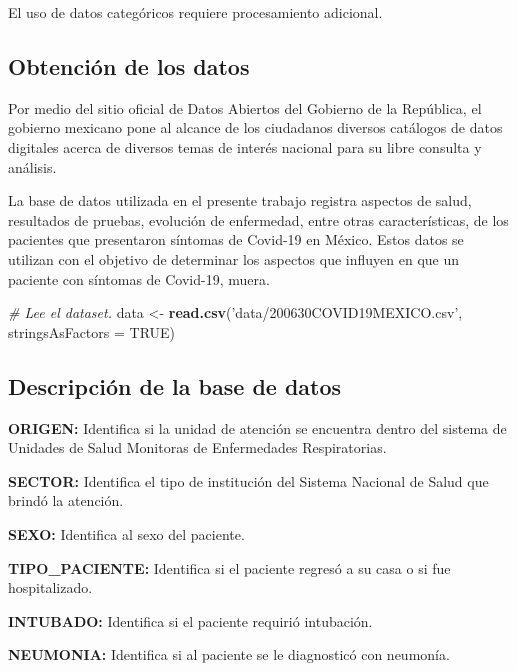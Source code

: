 \documentclass[]{article}
\newenvironment{Shaded}{\begin{snugshade}}{\end{snugshade}}
\newcommand{\CommentTok}[1]{\textcolor[rgb]{0.56,0.35,0.01}{\textit{#1}}}
\newcommand{\DataTypeTok}[1]{\textcolor[rgb]{0.13,0.29,0.53}{#1}}
\newcommand{\KeywordTok}[1]{\textcolor[rgb]{0.13,0.29,0.53}{\textbf{#1}}}
\newcommand{\NormalTok}[1]{#1}
\newcommand{\OtherTok}[1]{\textcolor[rgb]{0.56,0.35,0.01}{#1}}
\newcommand{\StringTok}[1]{\textcolor[rgb]{0.31,0.60,0.02}{#1}}
\begin{document}
El uso de datos categóricos requiere procesamiento adicional.

\hypertarget{obtenciuxf3n-de-los-datos}{%
\subsection{Obtención de los datos}\label{obtenciuxf3n-de-los-datos}}

Por medio del sitio oficial de Datos Abiertos del Gobierno de la
República, el gobierno mexicano pone al alcance de los ciudadanos
diversos catálogos de datos digitales acerca de diversos temas de
interés nacional para su libre consulta y análisis.

La base de datos utilizada en el presente trabajo registra aspectos de
salud, resultados de pruebas, evolución de enfermedad, entre otras
características, de los pacientes que presentaron síntomas de Covid-19
en México. Estos datos se utilizan con el objetivo de determinar los
aspectos que influyen en que un paciente con síntomas de Covid-19,
muera.

\begin{Shaded}
\begin{Highlighting}[]
\CommentTok{# Lee el dataset.}
\NormalTok{data <-}
\StringTok{  }\KeywordTok{read.csv}\NormalTok{(}\StringTok{'data/200630COVID19MEXICO.csv'}\NormalTok{, }\DataTypeTok{stringsAsFactors =} \OtherTok{TRUE}\NormalTok{)}
\end{Highlighting}
\end{Shaded}

\hypertarget{descripciuxf3n-de-la-base-de-datos}{%
\subsection{Descripción de la base de
datos}\label{descripciuxf3n-de-la-base-de-datos}}

\textbf{ORIGEN:} Identifica si la unidad de atención se encuentra dentro
del sistema de Unidades de Salud Monitoras de Enfermedades
Respiratorias.

\textbf{SECTOR:} Identifica el tipo de institución del Sistema Nacional
de Salud que brindó la atención.

\textbf{SEXO:} Identifica al sexo del paciente.

\textbf{TIPO\_PACIENTE:} Identifica si el paciente regresó a su casa o
si fue hospitalizado.

\textbf{INTUBADO:} Identifica si el paciente requirió intubación.

\textbf{NEUMONIA:} Identifica si al paciente se le diagnosticó con
neumonía.
\end{document}
